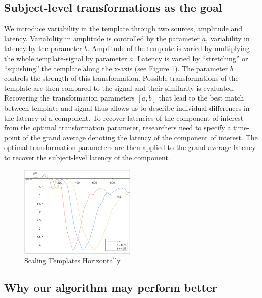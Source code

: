 \documentclass[
  man,floatsintext]{apa7}
\begin{document}
\hypertarget{subject-level-transformations-as-the-goal}{%
\subsection{Subject-level transformations as the goal}\label{subject-level-transformations-as-the-goal}}

We introduce variability in the template through two sources, amplitude and latency. Variability in amplitude is controlled by the parameter \(a\), variability in latency by the parameter \(b\). Amplitude of the template is varied by multiplying the whole template-signal by parameter \(a\). Latency is varied by ``stretching'' or ``squishing'' the template along the x-axis (see Figure \ref{fig:b-scale-example}). The parameter \(b\) controls the strength of this transformation. Possible transformations of the template are then compared to the signal and their similarity is evaluated. Recovering the transformation parameters \([a, b]\) that lead to the best match between template and signal thus allows us to describe individual differences in the latency of a component. To recover latencies of the component of interest from the optimal transformation parameter, researchers need to specify a time-point of the grand average denoting the latency of the component of interest. The optimal transformation parameters are then applied to the grand average latency to recover the subject-level latency of the component.



\begin{figure}
\includegraphics[width=2.19in]{images/b_scale} \caption{Scaling Templates Horizontally}\label{fig:b-scale-example}
\end{figure}

\hypertarget{why-our-algorithm-may-perform-better}{%
\subsection{Why our algorithm may perform better}\label{why-our-algorithm-may-perform-better}}
\end{document}
